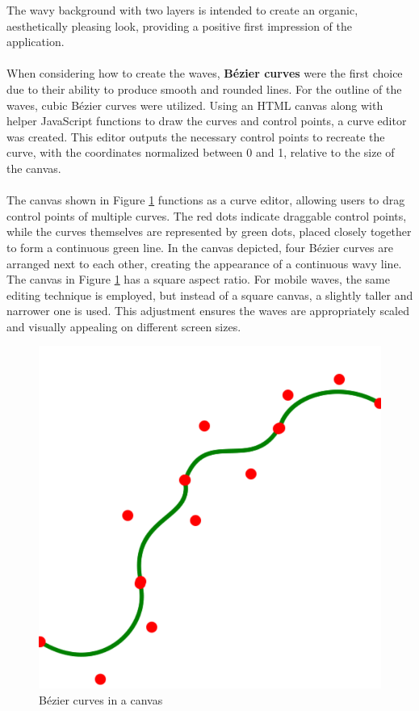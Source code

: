 \noindent The wavy background with two layers is intended to create an organic, aesthetically pleasing look, providing a positive first impression of the application.
\\\\
\noindent When considering how to create the waves, \textbf{Bézier curves} were the first choice due to their ability to produce smooth and rounded lines. For the outline of the waves, cubic Bézier curves were utilized. Using an HTML canvas along with helper JavaScript functions to draw the curves and control points, a curve editor was created. This editor outputs the necessary control points to recreate the curve, with the coordinates normalized between 0 and 1, relative to the size of the canvas.
\\\\
\noindent The canvas shown in Figure \ref{fig:figure8} functions as a curve editor, allowing users to drag control points of multiple curves. The red dots indicate draggable control points, while the curves themselves are represented by green dots, placed closely together to form a continuous green line. In the canvas depicted, four Bézier curves are arranged next to each other, creating the appearance of a continuous wavy line. The canvas in Figure \ref{fig:figure8} has a square aspect ratio. For mobile waves, the same editing technique is employed, but instead of a square canvas, a slightly taller and narrower one is used. This adjustment ensures the waves are appropriately scaled and visually appealing on different screen sizes.

\begin{figure}[h]
    \centering
    \includegraphics[scale=0.6]{images/bezier-curve-editor.png}
    \caption{Bézier curves in a canvas}
    \label{fig:figure8}
\end{figure}

